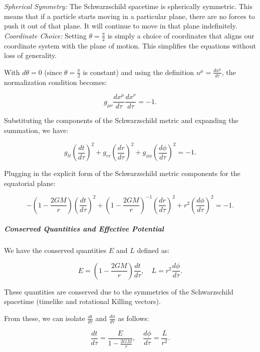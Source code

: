 \documentclass{article}
\begin{document}
\textit{Spherical Symmetry:} The Schwarzschild spacetime is spherically symmetric. This means that if a particle starts moving in a particular plane, there are no forces to push it out of that plane. It will continue to move in that plane indefinitely.
\textit{Coordinate Choice:} Setting \(\theta = \frac{\pi}{2}\) is simply a choice of coordinates that aligns our coordinate system with the plane of motion. This simplifies the equations without loss of generality.

With \(d\theta = 0\) (since \(\theta = \frac{\pi}{2}\) is constant) and using the definition \(u^\mu = \frac{dx^\mu}{d\tau}\), the normalization condition becomes:

\begin{equation*}
g_{\mu\nu} \frac{dx^\mu}{d\tau} \frac{dx^\nu}{d\tau} = -1.
\end{equation*}

Substituting the components of the Schwarzschild metric and expanding the summation, we have:

\begin{equation*}
g_{tt}\left(\frac{dt}{d\tau}\right)^2 + g_{rr}\left(\frac{dr}{d\tau}\right)^2 + g_{\phi\phi}\left(\frac{d\phi}{d\tau}\right)^2 = -1.
\end{equation*}

Plugging in the explicit form of the Schwarzschild metric components for the equatorial plane:

\begin{equation*}
-\left(1 - \frac{2GM}{r}\right)\left(\frac{dt}{d\tau}\right)^2 + \left(1 - \frac{2GM}{r}\right)^{-1} \left(\frac{dr}{d\tau}\right)^2 + r^2 \left(\frac{d\phi}{d\tau}\right)^2 = -1.
\end{equation*}

\subparagraph{Conserved Quantities and Effective Potential}

We have the conserved quantities \(E\) and \(L\) defined as:

\begin{equation*}
E = \left(1 - \frac{2GM}{r}\right) \frac{dt}{d\tau},
\quad
L = r^2 \frac{d\phi}{d\tau}.
\end{equation*}

These quantities are conserved due to the symmetries of the Schwarzschild spacetime (timelike and rotational Killing vectors).

From these, we can isolate \(\frac{dt}{d\tau}\) and \(\frac{d\phi}{d\tau}\) as follows:

\begin{equation*}
\frac{dt}{d\tau} = \frac{E}{1 - \frac{2GM}{r}},
\quad
\frac{d\phi}{d\tau} = \frac{L}{r^2}.
\end{equation*}
\end{document}

